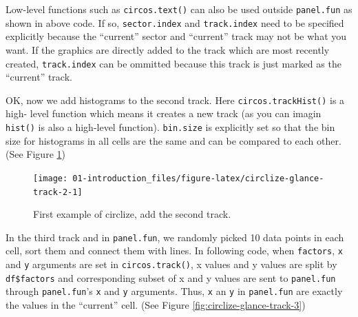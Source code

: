 \documentclass[]{book}
\newenvironment{Shaded}{\begin{snugshade}}{\end{snugshade}}
\newcommand{\KeywordTok}[1]{\textcolor[rgb]{0.13,0.29,0.53}{\textbf{#1}}}
\newcommand{\DataTypeTok}[1]{\textcolor[rgb]{0.13,0.29,0.53}{#1}}
\newcommand{\DecValTok}[1]{\textcolor[rgb]{0.00,0.00,0.81}{#1}}
\newcommand{\FloatTok}[1]{\textcolor[rgb]{0.00,0.00,0.81}{#1}}
\newcommand{\StringTok}[1]{\textcolor[rgb]{0.31,0.60,0.02}{#1}}
\newcommand{\OtherTok}[1]{\textcolor[rgb]{0.56,0.35,0.01}{#1}}
\newcommand{\OperatorTok}[1]{\textcolor[rgb]{0.81,0.36,0.00}{\textbf{#1}}}
\newcommand{\NormalTok}[1]{#1}
\begin{document}
Low-level functions such as \texttt{circos.text()} can also be used
outside \texttt{panel.fun} as shown in above code. If so,
\texttt{sector.index} and \texttt{track.index} need to be specified
explicitly because the ``current'' sector and ``current'' track may not
be what you want. If the graphics are directly added to the track which
are most recently created, \texttt{track.index} can be ommitted because
this track is just marked as the ``current'' track.

OK, now we add histograms to the second track. Here
\texttt{circos.trackHist()} is a high- level function which means it
creates a new track (as you can imagin \texttt{hist()} is also a
high-level function). \texttt{bin.size} is explicitly set so that the
bin size for histograms in all cells are the same and can be compared to
each other. (See Figure \ref{fig:circlize-glance-track-2})

\begin{Shaded}
\end{Shaded}

\begin{figure}

{\centering \texttt{[image: 01-introduction\_files/figure-latex/circlize-glance-track-2-1]} 

}

\caption{First example of circlize, add the second track.}\label{fig:circlize-glance-track-2}
\end{figure}

In the third track and in \texttt{panel.fun}, we randomly picked 10 data
points in each cell, sort them and connect them with lines. In following
code, when \texttt{factors}, \texttt{x} and \texttt{y} arguments are set
in \texttt{circos.track()}, x values and y values are split by
\texttt{df\$factors} and corresponding subset of x and y values are sent
to \texttt{panel.fun} through \texttt{panel.fun}'s \texttt{x} and
\texttt{y} arguments. Thus, \texttt{x} an \texttt{y} in
\texttt{panel.fun} are exactly the values in the ``current'' cell. (See
Figure \ref{fig:circlize-glance-track-3})
\end{document}

